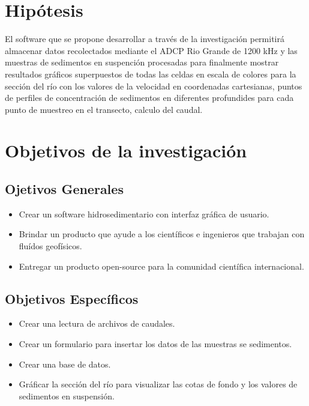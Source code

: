 \documentclass[12pt,a4paper]{report}
\begin{document}
\section{Hipótesis}
	El software que se propone desarrollar a través de la investigación permitirá almacenar datos recolectados mediante el ADCP Rio Grande de 1200 kHz y las muestras de sedimentos en suspención procesadas para finalmente mostrar resultados gráficos superpuestos de todas las celdas en escala de colores para la sección del río con los valores de la velocidad en coordenadas cartesianas, puntos de perfiles de concentración de sedimentos en diferentes profundides para cada punto de muestreo en el transecto, calculo del caudal.
\section{Objetivos de la investigación}
	\subsection{Ojetivos Generales}
	\begin{itemize}
	\item Crear un software hidrosedimentario con interfaz gráfica de usuario.
	\item Brindar un producto que ayude a los científicos e ingenieros que trabajan con fluídos geofísicos.
	\item Entregar un producto open-source para la comunidad científica internacional.
	\end{itemize}
	\subsection{Objetivos Específicos}
	\begin{itemize}
	\item Crear una lectura de archivos de caudales.
	\item Crear un formulario para insertar los datos de las muestras se sedimentos.
	\item Crear una base de datos.
	\item Gráficar la sección del río para visualizar las cotas de fondo y los valores de sedimentos en suspensión.
	\end{itemize}
\end{document}
